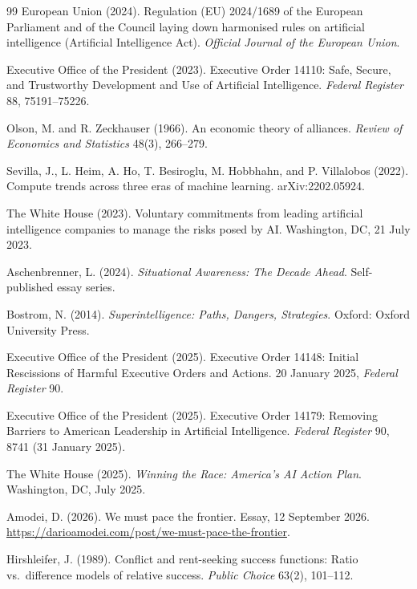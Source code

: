 \documentclass[11pt]{article}
\theoremstyle{plain}
\theoremstyle{definition}
\theoremstyle{remark}
\begin{document}
\begin{thebibliography}{99}
 European Union (2024). Regulation (EU) 2024/1689 of the European Parliament and of the Council laying down harmonised rules on artificial intelligence (Artificial Intelligence Act). \emph{Official Journal of the European Union}.

 Executive Office of the President (2023). Executive Order 14110: Safe, Secure, and Trustworthy Development and Use of Artificial Intelligence. \emph{Federal Register} 88, 75191--75226.

 Olson, M. and R. Zeckhauser (1966). An economic theory of alliances. \emph{Review of Economics and Statistics} 48(3), 266--279.

 Sevilla, J., L. Heim, A. Ho, T. Besiroglu, M. Hobbhahn, and P. Villalobos (2022). Compute trends across three eras of machine learning. arXiv:2202.05924.

 The White House (2023). Voluntary commitments from leading artificial intelligence companies to manage the risks posed by AI. Washington, DC, 21 July 2023.


 Aschenbrenner, L. (2024). \emph{Situational Awareness: The Decade Ahead}. Self-published essay series.

 Bostrom, N. (2014). \emph{Superintelligence: Paths, Dangers, Strategies}. Oxford: Oxford University Press.

 Executive Office of the President (2025). Executive Order 14148: Initial Rescissions of Harmful Executive Orders and Actions. 20 January 2025, \emph{Federal Register} 90.

 Executive Office of the President (2025). Executive Order 14179: Removing Barriers to American Leadership in Artificial Intelligence. \emph{Federal Register} 90, 8741 (31 January 2025).

 The White House (2025). \emph{Winning the Race: America's AI Action Plan}. Washington, DC, July 2025.


 Amodei, D. (2026). We must pace the frontier. Essay, 12 September 2026. \url{https://darioamodei.com/post/we-must-pace-the-frontier}.

 Hirshleifer, J. (1989). Conflict and rent-seeking success functions: Ratio vs.\ difference models of relative success. \emph{Public Choice} 63(2), 101--112.



\end{thebibliography}
\end{document}
